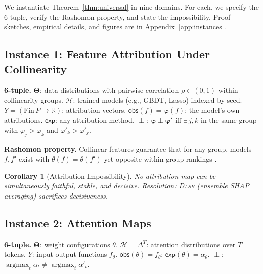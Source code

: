 \documentclass{article}
\newtheorem{corollary}{Corollary}
\newcommand{\R}{\mathbb{R}}
\newcommand{\DASH}{\textsc{Dash}}
\newcommand{\GBDT}{\textsc{GBDT}}
\newcommand{\Params}{\mathbf{\Theta}}
\newcommand{\sH}{\mathcal{H}}
\newcommand{\incomp}{\perp}
\begin{document}
We instantiate Theorem~\ref{thm:universal} in nine domains.  For each, we specify the 6-tuple, verify the Rashomon property, and state the impossibility.  Proof sketches, empirical details, and figures are in Appendix~\ref{app:instances}.

\subsection{Instance 1: Feature Attribution Under Collinearity}
\label{sec:inst-attr}

\textbf{6-tuple.}
$\Params$: data distributions with pairwise correlation $\rho \in (0,1)$ within collinearity groups.
$\sH$: trained models (e.g., \GBDT{}, Lasso) indexed by seed.
$Y = (\mathrm{Fin}\,P \to \R)$: attribution vectors.
$\mathsf{obs}(f) = \boldsymbol{\varphi}(f)$: the model's own attributions.
$\mathsf{exp}$: any attribution method.
$\incomp$: $\boldsymbol{\varphi} \incomp \boldsymbol{\varphi}'$ iff $\exists\, j,k$ in the same group with $\varphi_j > \varphi_k$ and $\varphi'_k > \varphi'_j$.

\textbf{Rashomon property.}
Collinear features guarantee that for any group, models $f, f'$ exist with $\theta(f) = \theta(f')$ yet opposite within-group rankings \citep{damour2022underspecification,fisher2019models}.

\begin{corollary}[Attribution Impossibility]
No attribution map can be simultaneously faithful, stable, and decisive. Resolution: \DASH{} (ensemble SHAP averaging) sacrifices decisiveness.
\end{corollary}

\subsection{Instance 2: Attention Maps}
\label{sec:inst-attn}

\textbf{6-tuple.}
$\Params$: weight configurations $\theta$.
$\sH = \Delta^T$: attention distributions over $T$ tokens.
$Y$: input-output functions $f_\theta$.
$\mathsf{obs}(\theta) = f_\theta$; $\mathsf{exp}(\theta) = \alpha_\theta$.
$\incomp$: $\operatorname{argmax}_t \alpha_t \neq \operatorname{argmax}_t \alpha'_t$.
\end{document}
